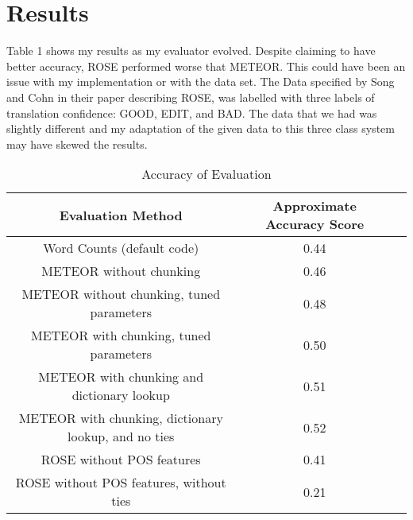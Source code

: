 \documentclass{article}
\begin{document}
\section{Results}
\par
Table 1 shows my results as my evaluator evolved. Despite claiming to have better accuracy, ROSE performed worse that METEOR. This could have been an issue with my implementation or with the data set. The Data specified by Song and Cohn in their paper describing ROSE, was labelled with three labels of translation confidence: GOOD, EDIT, and BAD. The data that we had was slightly different and my adaptation of the given data to this three class system may have skewed the results. 

\begin{table}[!h]
\caption{Accuracy of Evaluation}
\begin{center}

\begin{tabular}{|c|c|c|}
	\hline
	Evaluation Method & Approximate Accuracy Score \\
	\hline
	Word Counts (default code) & 0.44 \\
	\hline
	METEOR without chunking & 0.46 \\
	\hline
	METEOR without chunking, tuned parameters & 0.48 \\
	\hline
	METEOR with chunking, tuned parameters & 0.50 \\
	\hline
	METEOR with chunking and dictionary lookup & 0.51\\
	\hline
	METEOR with chunking, dictionary lookup, and no ties & 0.52\\
	\hline
	ROSE without POS features & 0.41 \\
	\hline
	ROSE without POS features, without ties & 0.21 \\
	\hline
\end{tabular}
\end{center}

\end{table}
	
\end{document}
